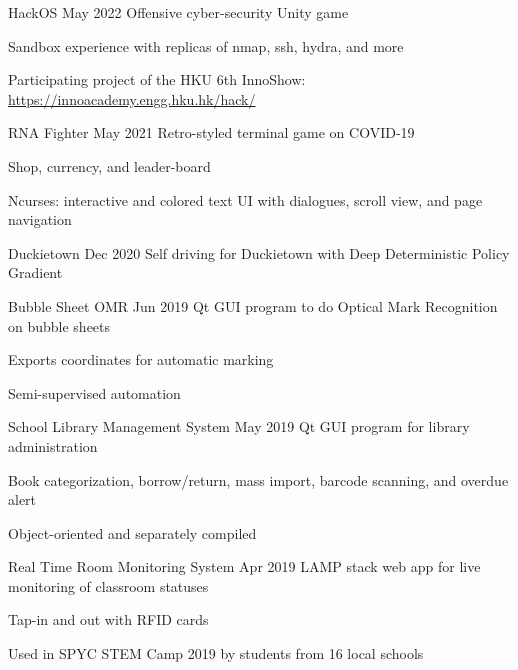 \jobTitle
{HackOS}
{May 2022}
{Offensive cyber-security Unity game}
\begin{descitemize}
    \item Sandbox experience with replicas of nmap, ssh, hydra, and more
    \item Participating project of the HKU 6th InnoShow: \href{https://innoacademy.engg.hku.hk/hack/}{https://innoacademy.engg.hku.hk/hack/}
\end{descitemize}

\jobTitle
{RNA Fighter}
{May 2021}
{Retro-styled terminal game on COVID-19}
\begin{descitemize}
	\item Shop, currency, and leader-board
	\item Ncurses: interactive and colored text UI with dialogues, scroll view, and page navigation
\end{descitemize}

\jobTitle
{Duckietown}
{Dec 2020}
{Self driving for Duckietown with Deep Deterministic Policy Gradient}

\jobTitle
{Bubble Sheet OMR}
{Jun 2019}
{Qt GUI program to do Optical Mark Recognition on bubble sheets}
\begin{descitemize}
    \item Exports coordinates for automatic marking
    \item Semi-supervised automation
\end{descitemize}

\jobTitle
{School Library Management System}
{May 2019}
{Qt GUI program for library administration}
\begin{descitemize}
    \item Book categorization, borrow/return, mass import, barcode scanning, and overdue alert
    \item Object-oriented and separately compiled
\end{descitemize}

\jobTitle
{Real Time Room Monitoring System}
{Apr 2019}
{LAMP stack web app for live monitoring of classroom statuses}
\begin{descitemize}
    \item Tap-in and out with RFID cards
    \item Used in SPYC STEM Camp 2019 by students from 16 local schools
\end{descitemize}

